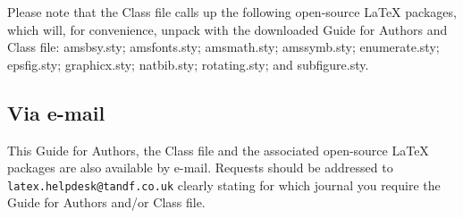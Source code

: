 \documentclass[]{tGIS2e}
\begin{document}
Please note that the Class file calls up the following open-source LaTeX packages, which will, for convenience,
unpack with the downloaded Guide for Authors and Class file: amsbsy.sty; amsfonts.sty; amsmath.sty; amssymb.sty; enumerate.sty; epsfig.sty; graphicx.sty; natbib.sty; rotating.sty; and subfigure.sty.

\subsection{Via e-mail}

This Guide for Authors, the Class file and the associated open-source LaTeX packages are also available by
e-mail. Requests should be addressed to {\tt latex.helpdesk@tandf.co.uk} clearly stating for which journal you
require the Guide for Authors and/or Class file.


\label{lastpage}
\end{document}
